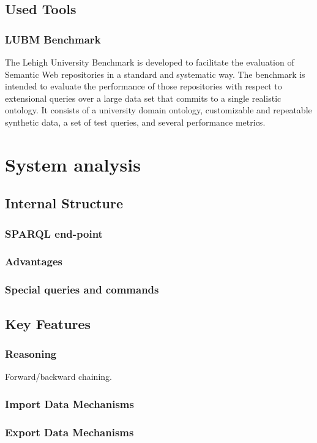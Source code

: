 \section{Used Tools}


\subsection{LUBM Benchmark}
The Lehigh University Benchmark is developed to facilitate the evaluation of
Semantic Web repositories in a standard and systematic way. The benchmark is
intended to evaluate the performance of those repositories with respect to
extensional queries over a large data set that commits to a single realistic
ontology. It consists of a university domain ontology, customizable and
repeatable synthetic data, a set of test queries, and several performance metrics.

\chapter{System analysis}
\section{Internal Structure}
\subsection{SPARQL end-point}
\subsection{Advantages}
\subsection{Special queries and commands}

\section{Key Features}
\subsection{Reasoning}
Forward/backward chaining.

\subsection{Import Data Mechanisms}

\subsection{Export Data Mechanisms}

